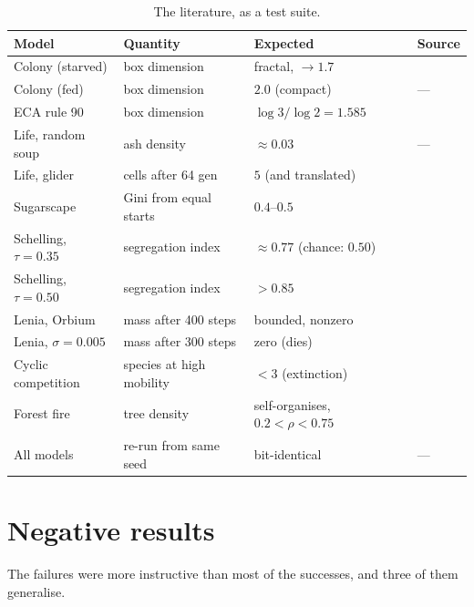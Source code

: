 \documentclass[11pt,a4paper]{article}
\begin{document}
\begin{table}[h]
\centering
\small
\begin{tabular}{@{}llll@{}}
\toprule
\textbf{Model} & \textbf{Quantity} & \textbf{Expected} & \textbf{Source} \\
\midrule
Colony (starved) & box dimension & fractal, $\to 1.7$ & \cite{witten1981,fujikawa1989} \\
Colony (fed) & box dimension & $2.0$ (compact) & --- \\
ECA rule 90 & box dimension & $\log 3/\log 2 = 1.585$ & \cite{wolfram1983} \\
Life, random soup & ash density & $\approx 0.03$ & --- \\
Life, glider & cells after 64 gen & $5$ (and translated) & \cite{gardner1970} \\
Sugarscape & Gini from equal starts & $0.4$--$0.5$ & \cite{epstein1996} \\
Schelling, $\tau=0.35$ & segregation index & $\approx 0.77$ (chance: $0.50$) & \cite{schelling1971} \\
Schelling, $\tau=0.50$ & segregation index & $> 0.85$ & \cite{schelling1971} \\
Lenia, Orbium & mass after 400 steps & bounded, nonzero & \cite{chan2019} \\
Lenia, $\sigma=0.005$ & mass after 300 steps & zero (dies) & \cite{chan2019} \\
Cyclic competition & species at high mobility & $< 3$ (extinction) & \cite{reichenbach2007} \\
Forest fire & tree density & self-organises, $0.2 < \rho < 0.75$ & \cite{drossel1992} \\
All models & re-run from same seed & bit-identical & --- \\
\bottomrule
\end{tabular}
\caption{The literature, as a test suite.}
\end{table}

\section{Negative results}
\label{sec:negative}

The failures were more instructive than most of the successes, and three of them
generalise.
\end{document}
